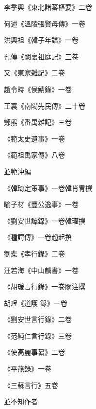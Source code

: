 \begin{pinyinscope}
 李季興《東北諸蕃樞要》二卷



 何述《溫陵張賢母傳》一卷



 洪興祖《韓子年譜》一卷



 孔傳《闕裏祖庭記》三卷



 又《東家雜記》二卷



 趙令畤《侯鯖錄》一卷



 王襄《南陽先民傳》二十卷



 鄭熊《番禺雜記》三卷



 《範太史遺事》一卷



 《範祖禹家傳》八卷



 並範沖編



 《韓琦定策事》一卷韓肖冑撰



 喻子材《豐公逸事》一卷



 《劉安世譚錄》一卷韓瓘撰



 《種諤傳》一卷趙起撰



 劉棐《孝行錄》二卷



 汪若海《中山麟書》一卷



 《胡瑗言行錄》一卷關注撰



 胡珵《道護
 錄》一卷



 《劉安世言行錄》二卷



 《范純仁言行錄》三卷



 《使高麗事纂》二卷



 《平燕錄》一卷



 《三蘇言行》五卷



 並不知作者




\end{pinyinscope}
